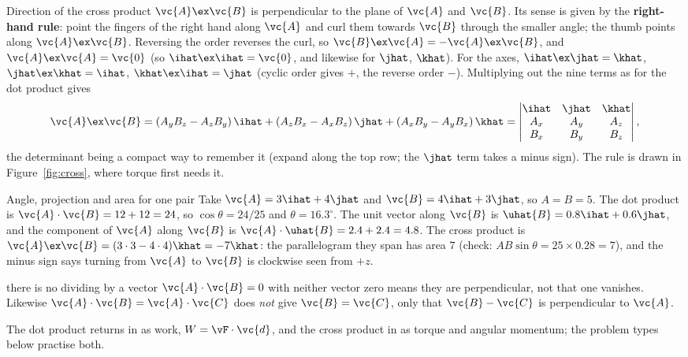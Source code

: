 \begin{keybox}{Direction of the cross product}
$\vc{A}\ex\vc{B}$ is perpendicular to the plane of $\vc{A}$ and $\vc{B}$. Its sense is given by the
\textbf{right-hand rule}: point the fingers of the right hand along $\vc{A}$ and curl them towards
$\vc{B}$ through the smaller angle; the thumb points along $\vc{A}\ex\vc{B}$. Reversing the order
reverses the curl, so $\vc{B}\ex\vc{A}=-\vc{A}\ex\vc{B}$, and $\vc{A}\ex\vc{A}=\vc{0}$ (so
$\ihat\ex\ihat=\vc{0}$, and likewise for $\jhat$, $\khat$). For the axes,
$\ihat\ex\jhat=\khat$, $\jhat\ex\khat=\ihat$, $\khat\ex\ihat=\jhat$ (cyclic order gives $+$, the
reverse order $-$). Multiplying out the nine terms as for the dot product gives
\[
\vc{A}\ex\vc{B}=(A_yB_z-A_zB_y)\,\ihat+(A_zB_x-A_xB_z)\,\jhat+(A_xB_y-A_yB_x)\,\khat
=\begin{vmatrix}\ihat&\jhat&\khat\\ A_x&A_y&A_z\\ B_x&B_y&B_z\end{vmatrix},
\]
the determinant being a compact way to remember it (expand along the top row; the $\jhat$ term takes a
minus sign). The rule is drawn in Figure~\ref{fig:cross}, where
torque first needs it.
\end{keybox}

\begin{exbox}{Angle, projection and area for one pair}
Take $\vc{A}=3\ihat+4\jhat$ and $\vc{B}=4\ihat+3\jhat$, so $A=B=5$. The dot product is
$\vc{A}\cdot\vc{B}=12+12=24$, so $\cos\theta=24/25$ and $\theta=16.3^\circ$. The unit vector along
$\vc{B}$ is $\uhat{B}=0.8\ihat+0.6\jhat$, and the component of $\vc{A}$ along $\vc{B}$ is
$\vc{A}\cdot\uhat{B}=2.4+2.4=4.8$. The cross product is $\vc{A}\ex\vc{B}=(3\cdot3-4\cdot4)\khat=-7\khat$:
the parallelogram they span has area $7$ (check: $AB\sin\theta=25\times0.28=7$), and the minus sign
says turning from $\vc{A}$ to $\vc{B}$ is clockwise seen from $+z$. 
\end{exbox}

\begin{trapbox}{there is no dividing by a vector}
$\vc{A}\cdot\vc{B}=0$ with neither vector zero means they are perpendicular, not that one vanishes.
Likewise $\vc{A}\cdot\vc{B}=\vc{A}\cdot\vc{C}$ does \emph{not} give
$\vc{B}=\vc{C}$, only that $\vc{B}-\vc{C}$ is perpendicular to $\vc{A}$.
\end{trapbox}

The dot product returns in  as work, $W=\vF\cdot\vc{d}$, and the cross product in
 as torque and angular momentum; the problem types below practise both.

